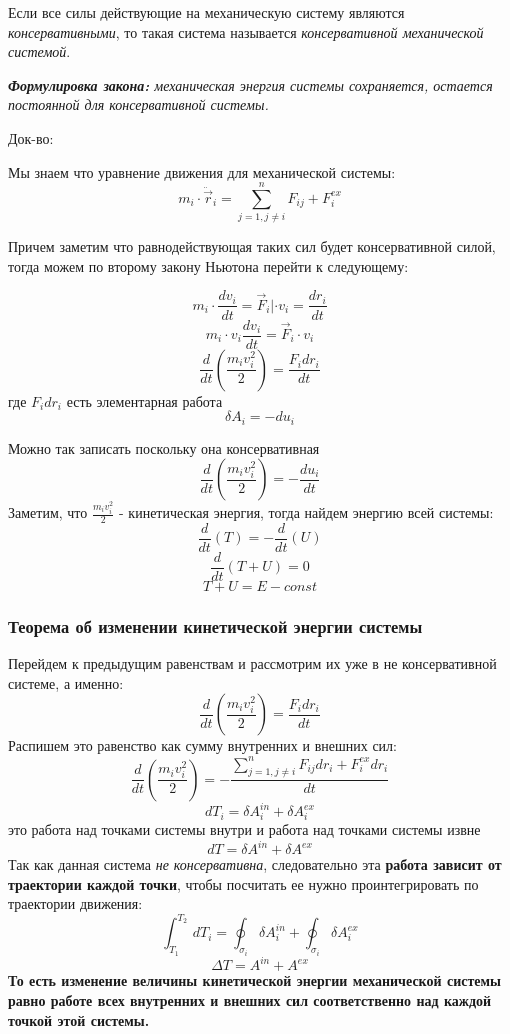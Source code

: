 \documentclass[../main.tex]{subfiles}
\begin{document}
\vspace{5px}

 Если все силы действующие на механическую систему являются \textit{консервативными}, то такая система называется \textit{консервативной механической системой}.

\vspace{5px}

\textit{\textbf{Формулировка закона:} механическая энергия системы сохраняется, остается постоянной для консервативной системы.}

\vspace{5px}

Док-во:

Мы знаем что уравнение движения для механической системы:
\[ m_i \cdot \ddot \vec r_i = \sum_{j=1, j \neq i }^n F_{ij} + F_i^{ex} \]

Причем заметим что равнодействующая таких сил будет консервативной силой, тогда можем по второму закону Ньютона перейти к следующему:

\[ m_i \cdot \frac{dv_i}{dt} = \vec F_i | \cdot v_i = \frac{dr_i}{dt}\]
\[ m_i\cdot v_i \frac{dv_i}{dt} = \vec F_i \cdot v_i \]
\[\frac{d}{dt}(\frac{m_i v^2_i}{2}) = \frac{F_i dr_i}{dt}\]
где ${F_i dr_i}$ есть элементарная работа
\[ \delta A_i = -du_i\]

Можно так записать поскольку она консервативная
\[\frac{d}{dt}(\frac{m_i v^2_i}{2}) = -\frac{du_i}{dt}\]
Заметим, что $\frac{m_i v^2_i}{2}$ - кинетическая энергия, тогда найдем энергию всей системы:
\[\frac{d}{dt}(T) = -\frac{d}{dt}(U) \] \[ \frac{d}{dt}(T+U) = 0 \]
\[T+U = E - const\]

\vspace{7px}


\subsubsection{Теорема об изменении кинетической энергии системы}

Перейдем к предыдущим равенствам и рассмотрим их уже в не консервативной системе, а именно:
\[ \frac{d}{dt}(\frac{m_i v^2_i}{2}) = \frac{F_i dr_i}{dt}\]
Распишем это равенство как сумму внутренних и внешних сил:
\[ \frac{d}{dt}(\frac{m_i v^2_i}{2}) = -\frac{\sum_{j=1, j \neq i }^n F_{ij} dr_i + F_i^{ex}dr_i}{dt}\]
\[dT_i = \delta A_i^{in} + \delta A_i ^{ex}\]
это работа над точками системы внутри и работа над точками системы извне
\[dT = \delta A^{in} + \delta A^{ex}\]
Так как данная система \textit{не консервативна}, следовательно эта \textbf{работа зависит от траектории каждой точки}, чтобы посчитать ее нужно проинтегрировать по траектории движения:
\[ \int_{T_1}^{T_2} \,dT_i = \oint_{\sigma_i} \delta A_i^{in} + \oint_{\sigma_i} \delta A_i^{ex}\]
\[ \Delta T =  A^{in} + A^{ex}\]
\textbf{То есть изменение величины кинетической энергии механической системы равно работе всех внутренних и внешних сил соответственно над каждой точкой этой системы.}
\end{document}
